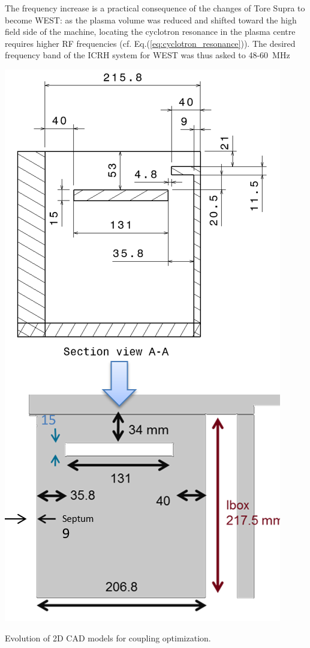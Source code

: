 The frequency increase is a practical consequence of the changes of Tore Supra to become WEST: as the plasma volume was reduced and  shifted toward the high field side of the machine, locating the cyclotron resonance in the plasma centre requires higher RF frequencies (cf. Eq.(\ref{eq:cyclotron_resonance})). The desired frequency band of the ICRH system for WEST was thus asked to 48-60~MHz 

\begin{marginfigure}
	\centering
	\includegraphics[width=0.8\linewidth]{figures/chap3/WEST_ICRH/WEST_front_face_evolution1}
	\caption{Evolution of 2D CAD models for coupling optimization.}
	\label{fig:westfrontfaceevolution1}
\end{marginfigure}

